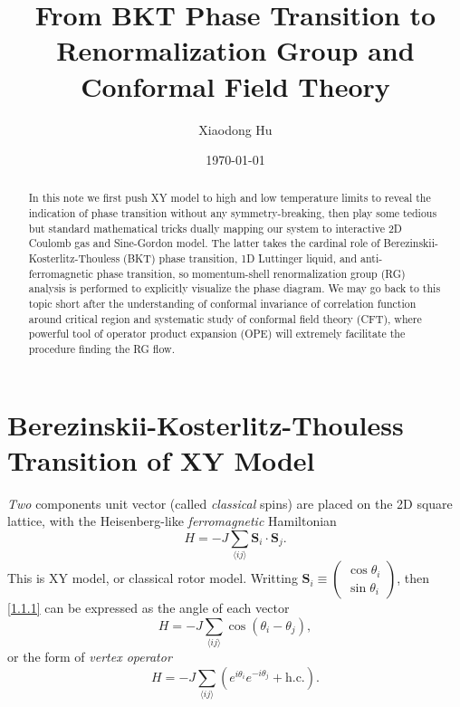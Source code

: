 \documentclass[10pt,nofootinbib]{revtex4}
\begin{document}
\title{From BKT Phase Transition to Renormalization Group and Conformal Field Theory}%

\author{Xiaodong Hu}

\date{\today}


\begin{abstract}
	In this note we first push XY model to high and low temperature limits to reveal the indication of phase transition without any symmetry-breaking, then play some tedious but standard mathematical tricks dually mapping our system to interactive 2D Coulomb gas and Sine-Gordon model. The latter takes the cardinal role of Berezinskii-Kosterlitz-Thouless (BKT) phase transition, 1D Luttinger liquid, and anti-ferromagnetic phase transition, so momentum-shell renormalization group (RG) analysis is performed to explicitly visualize the phase diagram. We may go back to this topic short after the understanding of conformal invariance of correlation function around critical region and systematic study of conformal field theory (CFT), where powerful tool of operator product expansion (OPE) will extremely facilitate the procedure finding the RG flow.
\end{abstract}
\maketitle
\tableofcontents

\section{Berezinskii-Kosterlitz-Thouless Transition of XY Model}
	\emph{Two} components unit vector (called \emph{classical} spins) are placed on the 2D square lattice, with the Heisenberg-like \emph{ferromagnetic} Hamiltonian
	\begin{equation}\label{1.1.1}
		H=-J\sum_{\langle ij\rangle }\bm{S}_i\cdot\bm{S}_j.
	\end{equation}
	This is XY model, or classical rotor model. Writting $\bm{S}_i\equiv\left(\begin{array}{c}
		\cos\theta_i\\
		\sin\theta_i
	\end{array}\right)$, then \eqref{1.1.1} can be expressed as the angle of each vector
	\begin{equation}\label{1.1.2}
		H=-J\sum_{\langle ij \rangle }\cos(\theta_i-\theta_j),
	\end{equation}
	or the form of \emph{vertex operator}
	\begin{equation}\label{1.1.2}
		H=-J\sum_{\langle ij \rangle }(e^{i \theta_i}e^{-i \theta_j}+\text{h.c.}).
	\end{equation}
\end{document}
